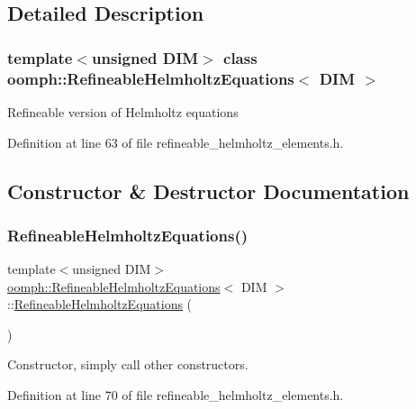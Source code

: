 \subsection{Detailed Description}
\subsubsection*{template$<$unsigned D\+IM$>$\newline
class oomph\+::\+Refineable\+Helmholtz\+Equations$<$ D\+I\+M $>$}

Refineable version of Helmholtz equations 

Definition at line 63 of file refineable\+\_\+helmholtz\+\_\+elements.\+h.



\subsection{Constructor \& Destructor Documentation}
\mbox{\label{classoomph_1_1RefineableHelmholtzEquations_a7b33736187e9f98fcdae1c8187cd819b}} 
\subsubsection{\texorpdfstring{Refineable\+Helmholtz\+Equations()}{RefineableHelmholtzEquations()}\hspace{0.1cm}{\footnotesize\ttfamily [1/2]}}
{\footnotesize\ttfamily template$<$unsigned D\+IM$>$ \\
\hyperlink{classoomph_1_1RefineableHelmholtzEquations}{oomph\+::\+Refineable\+Helmholtz\+Equations}$<$ D\+IM $>$\+::\hyperlink{classoomph_1_1RefineableHelmholtzEquations}{Refineable\+Helmholtz\+Equations} (\begin{DoxyParamCaption}{ }\end{DoxyParamCaption})\hspace{0.3cm}{\ttfamily [inline]}}



Constructor, simply call other constructors. 



Definition at line 70 of file refineable\+\_\+helmholtz\+\_\+elements.\+h.

